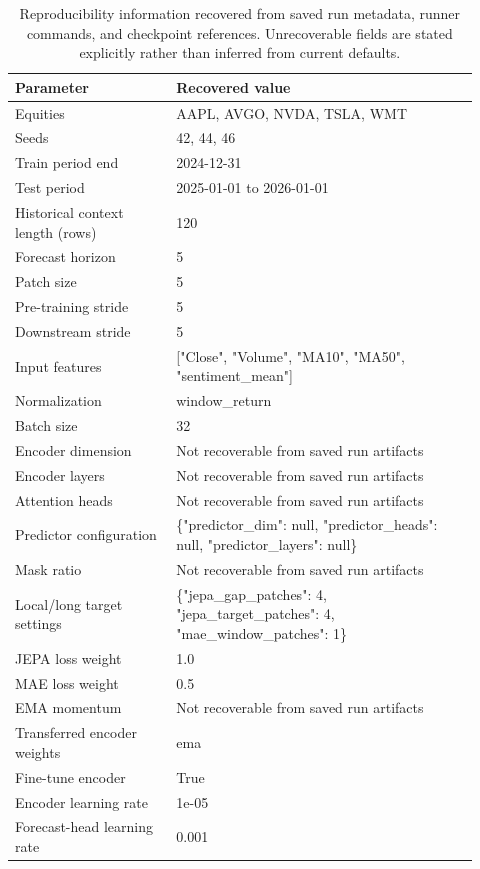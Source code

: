 \begin{table}[p]
\centering
\small
\caption{Reproducibility information recovered from saved run metadata, runner commands, and checkpoint references. Unrecoverable fields are stated explicitly rather than inferred from current defaults.}
\label{tab:reproducibility}
\begin{tabular}{p{0.32\linewidth}p{0.60\linewidth}}
\toprule
Parameter & Recovered value \\
\midrule
Equities & AAPL, AVGO, NVDA, TSLA, WMT \\
Seeds & 42, 44, 46 \\
Train period end & 2024-12-31 \\
Test period & 2025-01-01 to 2026-01-01 \\
Historical context length (rows) & 120 \\
Forecast horizon & 5 \\
Patch size & 5 \\
Pre-training stride & 5 \\
Downstream stride & 5 \\
Input features & ["Close", "Volume", "MA10", "MA50", "sentiment\_mean"] \\
Normalization & window\_return \\
Batch size & 32 \\
Encoder dimension & Not recoverable from saved run artifacts \\
Encoder layers & Not recoverable from saved run artifacts \\
Attention heads & Not recoverable from saved run artifacts \\
Predictor configuration & \{"predictor\_dim": null, "predictor\_heads": null, "predictor\_layers": null\} \\
Mask ratio & Not recoverable from saved run artifacts \\
Local/long target settings & \{"jepa\_gap\_patches": 4, "jepa\_target\_patches": 4, "mae\_window\_patches": 1\} \\
JEPA loss weight & 1.0 \\
MAE loss weight & 0.5 \\
EMA momentum & Not recoverable from saved run artifacts \\
Transferred encoder weights & ema \\
Fine-tune encoder & True \\
Encoder learning rate & 1e-05 \\
Forecast-head learning rate & 0.001 \\

\end{tabular}
\end{table}
